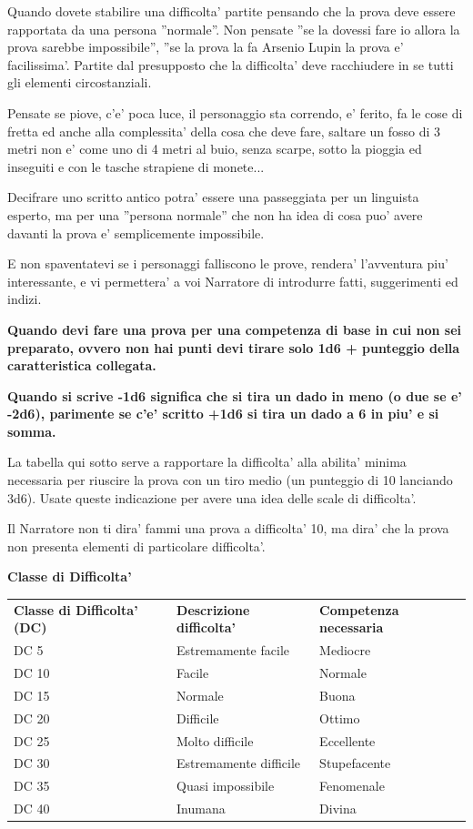 \documentclass[a4paper,11pt,twoside,openany]{book}
\begin{document}
Quando dovete stabilire una difficolta' partite pensando che la prova deve essere rapportata da una persona ''normale''. Non pensate ''se la dovessi fare io allora la prova sarebbe impossibile'', ''se la prova la fa Arsenio Lupin la prova e' facilissima'. Partite dal presupposto che la difficolta' deve racchiudere in se tutti gli elementi circostanziali.

Pensate se piove, c'e' poca luce, il personaggio sta correndo, e' ferito, fa le cose di fretta ed anche alla complessita' della cosa che deve fare, saltare un fosso di 3 metri non e' come uno di 4 metri al buio, senza scarpe, sotto la pioggia ed inseguiti e con le tasche strapiene di monete...

Decifrare uno scritto antico potra' essere una passeggiata per un linguista esperto, ma per una ''persona normale'' che non ha idea di cosa puo' avere davanti la prova e' semplicemente impossibile.

E non spaventatevi se i personaggi falliscono le prove, rendera' l'avventura piu' interessante, e vi permettera' a voi Narratore di introdurre fatti, suggerimenti ed indizi.

\bigskip

\textbf{Quando devi fare una prova per una competenza di base in cui non sei preparato, ovvero non hai punti devi tirare solo 1d6 + punteggio della caratteristica collegata.}

\textbf{Quando si scrive -1d6 significa che si tira un dado in meno (o due se e' -2d6), parimente se c'e' scritto +1d6 si tira un dado a 6 in piu' e si somma.}

\bigskip

La tabella qui sotto serve a rapportare la difficolta' alla abilita' minima necessaria per riuscire la prova con un tiro medio (un punteggio di 10 lanciando 3d6). Usate queste indicazione per avere una idea delle scale di difficolta'.

Il Narratore non ti dira' fammi una prova a difficolta' 10, ma dira' che la prova non presenta elementi di particolare difficolta'.

\bigskip

\textbf{Classe di Difficolta'}
\medskip

\begin{tabular}{lll}
\toprule
\textbf{Classe di Difficolta' (DC)} & \textbf{Descrizione difficolta'} &\textbf{ Competenza necessaria}\tabularnewline
DC 5 & Estremamente facile & Mediocre\tabularnewline
DC 10 & Facile & Normale\tabularnewline
DC 15 & Normale & Buona\tabularnewline
DC 20 & Difficile & Ottimo\tabularnewline
DC 25 & Molto difficile & Eccellente\tabularnewline
DC 30 & Estremamente difficile & Stupefacente\tabularnewline
DC 35 & Quasi impossibile & Fenomenale\tabularnewline
DC 40 & Inumana & Divina\tabularnewline

\end{tabular}
\end{document}
